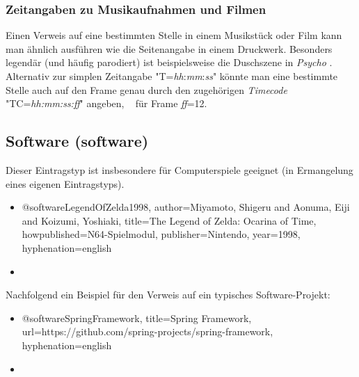 \subsubsection{Zeitangaben zu Musikaufnahmen und Filmen} 

Einen Verweis auf eine bestimmten Stelle in einem Musikstück oder Film kann man 
ähnlich ausführen wie die Seitenangabe in einem Druckwerk.
Besonders legendär (und häufig parodiert) ist beispielsweise die Duschszene
in \emph{Psycho} \cite[T=00:32:10]{Psycho1960}.
Alternativ zur simplen Zeitangabe "T=\emph{hh}:\emph{mm}:\emph{ss}" 
könnte man eine bestimmte Stelle auch auf den Frame genau durch 
den zugehörigen \emph{Timecode} "TC=\emph{hh:mm:ss:ff}" angeben, 
\zB\ \cite[TC=00:32:10:12]{Psycho1960} für Frame \emph{ff}=12.



\subsection{Software (\textsf{software})}
\label{sec:@software}



Dieser Eintragstyp ist insbesondere für Computerspiele geeignet (in Ermangelung
eines eigenen Eintragstyps).
%
\begin{itemize}
\item[] 
\begin{GenericCode}[numbers=none]
@software{LegendOfZelda1998,
  author={Miyamoto, Shigeru and Aonuma, Eiji and Koizumi, Yoshiaki},
  title={The Legend of Zelda: Ocarina of Time},
  howpublished={N64-Spielmodul},
  publisher={Nintendo},
  year={1998},
  hyphenation={english}
}
\end{GenericCode}
\item[\cite{LegendOfZelda1998}] 
\end{itemize}

\noindent
Nachfolgend ein Beispiel für den Verweis auf ein typisches Software-Projekt:
%
\begin{itemize}
\item[] 
\begin{GenericCode}[numbers=none]
@software{SpringFramework,
	title={Spring Framework},
	url={https://github.com/spring-projects/spring-framework},
	hyphenation={english}
}
\end{GenericCode}
\item[\cite{SpringFramework}] 
\end{itemize}



